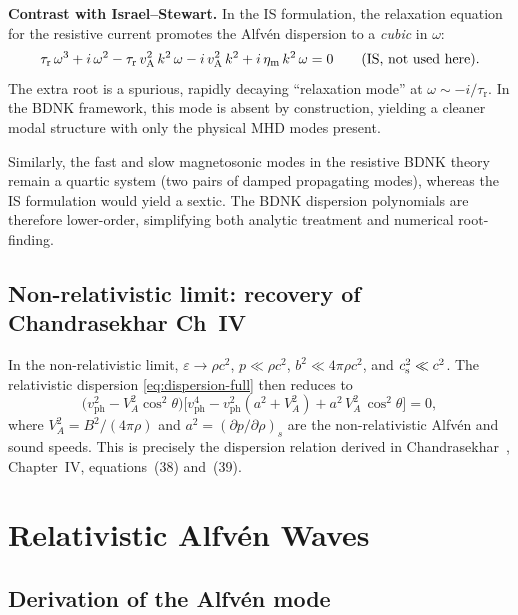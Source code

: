 \medskip\noindent
\textbf{Contrast with Israel--Stewart.}\quad
In the IS formulation, the relaxation equation for the resistive current
promotes the Alfv\'en dispersion to a \emph{cubic} in $\omega$:
\[
  \tau_{\mathrm{r}}\,\omega^{3}
  + i\,\omega^{2}
  - \tau_{\mathrm{r}}\,v_{\mathrm{A}}^{2}\,k^{2}\,\omega
  - i\,v_{\mathrm{A}}^{2}\,k^{2}
  + i\,\eta_{\mathrm{m}}\,k^{2}\,\omega = 0
  \qquad\text{(IS, not used here)}.
\]
The extra root is a spurious, rapidly decaying ``relaxation mode'' at
$\omega \sim -i/\tau_{\mathrm{r}}$.  In the BDNK framework, this mode
is absent by construction, yielding a cleaner modal structure with
only the physical MHD modes present.

Similarly, the fast and slow magnetosonic modes in the resistive BDNK
theory remain a quartic system (two pairs of damped propagating modes),
whereas the IS formulation would yield a sextic.  The BDNK dispersion
polynomials are therefore lower-order, simplifying both analytic treatment
and numerical root-finding.

\subsection{Non-relativistic limit: recovery of Chandrasekhar Ch~IV}

In the non-relativistic limit, $\varepsilon \to \rho c^{2}$,
$p \ll \rho c^{2}$, $b^{2}\ll 4\pi\rho c^{2}$, and $c_{\mathrm{s}}^{2}\ll c^{2}$.
The relativistic dispersion \eqref{eq:dispersion-full} then reduces to
\begin{equation}
  \bigl(v_{\mathrm{ph}}^{2} - V_{\!A}^{2}\cos^{2}\!\theta\bigr)
  \bigl[v_{\mathrm{ph}}^{4}
    - v_{\mathrm{ph}}^{2}(a^{2}+V_{\!A}^{2})
    + a^{2}\,V_{\!A}^{2}\,\cos^{2}\!\theta\bigr] = 0,
  \label{eq:dispersion-NR}
\end{equation}
where $V_{\!A}^{2} = B^{2}/(4\pi\rho)$ and $a^{2}=(\partial p/\partial\rho)_{s}$
are the non-relativistic Alfv\'en and sound speeds.  This is precisely the
dispersion relation derived in Chandrasekhar~\cite{Chandrasekhar1961},
Chapter~IV, equations~(38) and~(39).


\section{Relativistic Alfv\'en Waves}
\label{sec:rel-alfven}

\subsection{Derivation of the Alfv\'en mode}

